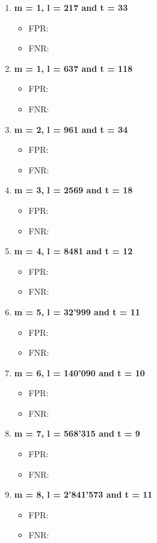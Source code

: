 \begin{enumerate}
    \item \textbf{m = 1, l = 217 and t = 33}
        \begin{itemize}
            \item FPR: 
            \item FNR: 
        \end{itemize}
    \item \textbf{m = 1, l = 637 and t = 118}
        \begin{itemize}
            \item FPR: 
            \item FNR: 
        \end{itemize}
    \item \textbf{m = 2, l = 961 and t = 34}
        \begin{itemize}
            \item FPR: 
            \item FNR: 
        \end{itemize}
    \item \textbf{m = 3, l = 2569 and t = 18}
        \begin{itemize}
            \item FPR: 
            \item FNR: 
        \end{itemize}
    \item \textbf{m = 4, l = 8481 and t = 12}
        \begin{itemize}
            \item FPR: 
            \item FNR: 
        \end{itemize}
    \item \textbf{m = 5, l = 32'999 and t = 11}
        \begin{itemize}
            \item FPR: 
            \item FNR: 
        \end{itemize}
    \item \textbf{m = 6, l = 140'090 and t = 10}
        \begin{itemize}
            \item FPR: 
            \item FNR: 
        \end{itemize}
    \item \textbf{m = 7, l = 568'315 and t = 9}
        \begin{itemize}
            \item FPR: 
            \item FNR: 
        \end{itemize}
    \item \textbf{m = 8, l = 2'841'573 and t = 11}
        \begin{itemize}
            \item FPR: 
            \item FNR: 
        \end{itemize}
\end{enumerate}

